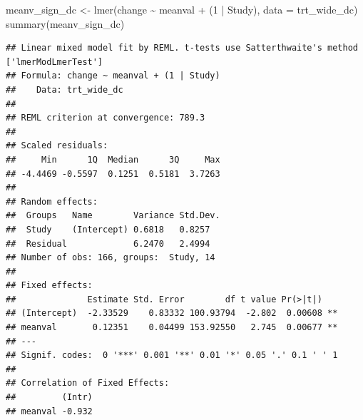 \documentclass[
]{article}
\newenvironment{Shaded}{\begin{snugshade}}{\end{snugshade}}
\newcommand{\AttributeTok}[1]{\textcolor[rgb]{0.77,0.63,0.00}{#1}}
\newcommand{\DecValTok}[1]{\textcolor[rgb]{0.00,0.00,0.81}{#1}}
\newcommand{\FunctionTok}[1]{\textcolor[rgb]{0.00,0.00,0.00}{#1}}
\newcommand{\NormalTok}[1]{#1}
\newcommand{\OtherTok}[1]{\textcolor[rgb]{0.56,0.35,0.01}{#1}}
\newcommand{\SpecialCharTok}[1]{\textcolor[rgb]{0.00,0.00,0.00}{#1}}
\begin{document}
\begin{Shaded}
\begin{Highlighting}[]
\NormalTok{meanv\_sign\_dc }\OtherTok{\textless{}{-}} \FunctionTok{lmer}\NormalTok{(change }\SpecialCharTok{\textasciitilde{}}\NormalTok{ meanval }\SpecialCharTok{+}\NormalTok{ (}\DecValTok{1} \SpecialCharTok{|}\NormalTok{ Study), }\AttributeTok{data =}\NormalTok{ trt\_wide\_dc)}
\FunctionTok{summary}\NormalTok{(meanv\_sign\_dc)}
\end{Highlighting}
\end{Shaded}

\begin{verbatim}
## Linear mixed model fit by REML. t-tests use Satterthwaite's method ['lmerModLmerTest']
## Formula: change ~ meanval + (1 | Study)
##    Data: trt_wide_dc
## 
## REML criterion at convergence: 789.3
## 
## Scaled residuals: 
##     Min      1Q  Median      3Q     Max 
## -4.4469 -0.5597  0.1251  0.5181  3.7263 
## 
## Random effects:
##  Groups   Name        Variance Std.Dev.
##  Study    (Intercept) 0.6818   0.8257  
##  Residual             6.2470   2.4994  
## Number of obs: 166, groups:  Study, 14
## 
## Fixed effects:
##              Estimate Std. Error        df t value Pr(>|t|)   
## (Intercept)  -2.33529    0.83332 100.93794  -2.802  0.00608 **
## meanval       0.12351    0.04499 153.92550   2.745  0.00677 **
## ---
## Signif. codes:  0 '***' 0.001 '**' 0.01 '*' 0.05 '.' 0.1 ' ' 1
## 
## Correlation of Fixed Effects:
##         (Intr)
## meanval -0.932
\end{verbatim}
\end{document}
